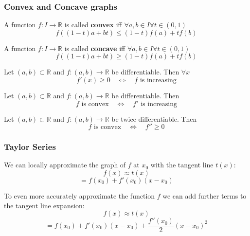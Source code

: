 \subsubsection{Convex and Concave graphs}

\begin{definition}
    A function $f: I \to \mathbb{R}$ is called \textbf{convex} iff $\forall a, b \in I \forall t \in (0, 1)$
    $$f((1-t)a + bt) \leq (1-t) f(a) + t f(b)$$
\end{definition}

\begin{definition}
    A function $f: I \to \mathbb{R}$ is called \textbf{concave} iff $\forall a, b \in I \forall t \in (0, 1)$
    $$f((1-t)a + bt) \geq (1-t) f(a) + t f(b)$$
\end{definition}

\begin{theorem}
    Let $(a, b) \subset \mathbb{R}$ and $f: (a, b) \to \mathbb{R}$ be differentiable. Then $\forall x$
    $$f'(x) \geq 0 \quad \iff \quad f \text{ is increasing}$$
\end{theorem}

\begin{theorem}
    Let $(a, b) \subset \mathbb{R}$ and $f: (a, b) \to \mathbb{R}$ be differentiable. Then
    $$f \text{ is convex} \quad \iff \quad f' \text{ is increasing}$$
\end{theorem}

\begin{theorem}
    Let $(a, b) \subset \mathbb{R}$ and $f: (a, b) \to \mathbb{R}$ be twice differentiable. Then
    $$f \text{ is convex} \quad \iff \quad f'' \geq 0$$
\end{theorem}

\subsubsection{Taylor Series}

\begin{lemma}
    We can locally approximate the graph of $f$ at $x_0$ with the tangent line $t(x)$:
    $$f(x) \approx t(x)$$
    $$= f(x_0) + f'(x_0)(x-x_0)$$
\end{lemma}

\begin{lemma}
    To even more accurately approximate the function $f$ we can add further terms to the tangent line expansion:
    $$f(x) \approx t(x)$$
    $$= f(x_0) + f'(x_0)(x-x_0) + \frac{f''(x_0)}{2}(x-x_0)^2$$
\end{lemma}

